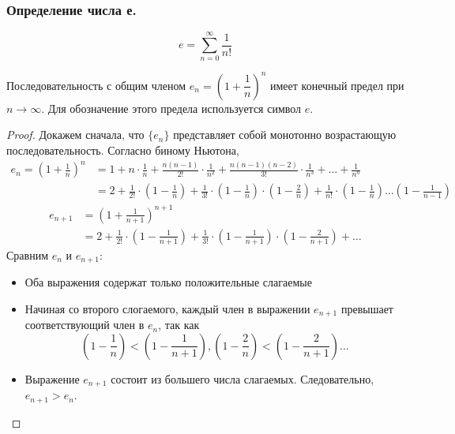 \documentclass[12pt, a4paper]{article}
\begin{document}
	\subsubsection{Определение числа е.}
	\begin{equation*}
		e = \sum_{n = 0}^{\infty} \dfrac{1}{n!}
	\end{equation*}
	\begin{theorem*}
		Последовательность с общим членом $e_n = \left(1 + \dfrac{1}{n}\right)^n$ имеет конечный предел при $n \to \infty$. Для обозначение этого предела используется символ $e$.
	\end{theorem*}
	\begin{proof}
		Докажем сначала, что $\{e_n\}$ представляет собой монотонно возрастающую последовательность. Согласно биному Ньютона,
		\begin{align*}
			e_n = \left(1 + \frac{1}{n}\right)^n 
			&= 1 + n \cdot \frac{1}{n} + \frac{n (n - 1)}{2!} \cdot \frac{1}{n^2} + \frac{n(n - 1)(n - 2)}{3!} \cdot \frac{1}{n^3} + \dots + \frac{1}{n^n} \\
			&= 2 + \frac{1}{2!} \cdot \left(1 - \frac{1}{n}\right) + \frac{1}{3!} \cdot \left(1 - \frac{1}{n}\right) \cdot \left(1 - \frac{2}{n}\right) + \frac{1}{n!} \cdot \left(1 - \frac{1}{n}\right) \dots \left(1 - \frac{1}{n - 1}\right)
		\end{align*}
		\begin{align*}
			e_{n + 1} &= \left(1 + \frac{1}{n + 1}\right)^{n + 1} \\
			&= 2 + \frac{1}{2!} \cdot \left(1 - \frac{1}{n + 1}\right) + \frac{1}{3!} \cdot \left(1 - \frac{1}{n + 1}\right) \cdot \left(1 - \frac{2}{n + 1}\right) + \dots
		\end{align*}
		Сравним $e_n$ и $e_{n + 1}$:
		\begin{itemize}
			\item
			Оба выражения содержат только положительные слагаемые

			\item
			Начиная со второго слогаемого, каждый член в выражении $e_{n + 1}$ превышает соответствующий член в $e_n$, так как
			\begin{equation*}
				\left(1 - \frac{1}{n}\right) < \left(1 - \frac{1}{n + 1}\right),
				\left(1 - \frac{2}{n}\right) < \left(1 - \frac{2}{n + 1}\right) \dots
			\end{equation*}

			\item
			Выражение $e_{n + 1}$ состоит из большего числа слагаемых. Следовательно, $e_{n + 1} > e_n$.
		\end{itemize}


\end{proof}
\end{document}
